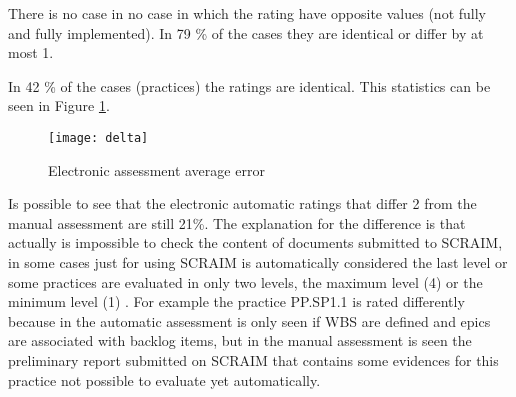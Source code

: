 There is no case in no case in which the rating have opposite values (not fully and fully implemented). In 79 \% of the cases they are identical or differ by at most 1.

In 42 \% of the cases (practices) the ratings are identical. This statistics can be seen in Figure \ref{fig:errorresults}.

\begin{figure}[H]
	\begin{center}
		\leavevmode
		\texttt{[image: delta]}
		\caption{Electronic assessment average error}
		\label{fig:errorresults}
	\end{center}
\end{figure}

Is possible to see that the electronic automatic ratings that differ 2 from the manual assessment are still 21\%. The explanation for the difference is that actually is impossible to check the content of documents submitted to SCRAIM, in some cases just for using SCRAIM is automatically considered the last level or some practices are evaluated in only two levels, the maximum level (4)  or the minimum level (1) . For example the practice PP.SP1.1 is rated differently because in the automatic assessment is only seen if WBS are defined and epics are associated with backlog items, but in the manual assessment is seen the preliminary report submitted on SCRAIM that contains some evidences for this practice not possible to evaluate yet automatically.

%

